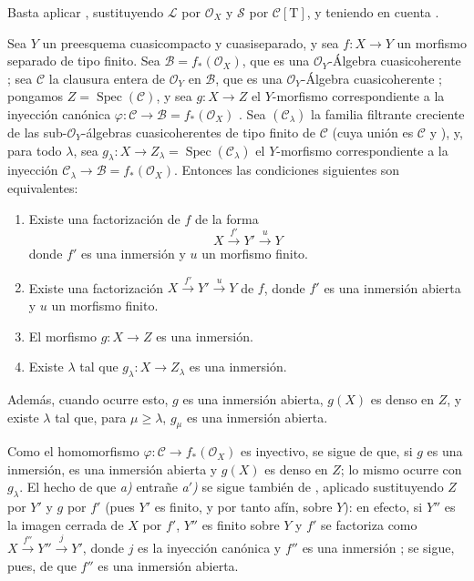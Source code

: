 Basta aplicar , sustituyendo $\mathcal L$ por $\mathcal O_X$ y $\mathcal S$ por $\mathcal C[\mathrm T]$, y teniendo en cuenta .


\begin{proposition}[8.12.3]
Sea $Y$ un preesquema cuasicompacto y cuasiseparado, y sea $f:X\to Y$ un morfismo separado de tipo finito.
Sea $\mathcal B=f_*(\mathcal O_X)$, que es una $\mathcal O_Y$-Álgebra cuasicoherente ; sea $\mathcal C$ la clausura entera de $\mathcal O_Y$ en $\mathcal B$, que es una $\mathcal O_Y$-Álgebra cuasicoherente ; pongamos $Z=\operatorname{Spec}(\mathcal C)$, y sea $g:X\to Z$ el $Y$-morfismo correspondiente a la inyección canónica $\varphi:\mathcal C\to\mathcal B=f_*(\mathcal O_X)$ . Sea $(\mathcal C_\lambda)$ la familia filtrante creciente de las sub-$\mathcal O_Y$-álgebras cuasicoherentes de tipo finito de $\mathcal C$ (cuya unión es $\mathcal C$  y ), y, para todo $\lambda$, sea $g_\lambda:X\to Z_\lambda=\operatorname{Spec}(\mathcal C_\lambda)$ el $Y$-morfismo correspondiente a la inyección $\mathcal C_\lambda\to\mathcal B=f_*(\mathcal O_X)$.
Entonces las condiciones siguientes son equivalentes:
\begin{enumerate}[label=\emph{\alph*)}]
  \item[\emph{a)}] Existe una factorización de $f$ de la forma
\[
X\xrightarrow{f'}Y'\xrightarrow{u}Y
\]
donde $f'$ es una inmersión y $u$ un morfismo finito.
  \item[\emph{a$'$)}] Existe una factorización $X\xrightarrow{f'}Y'\xrightarrow{u}Y$ de $f$, donde $f'$ es una inmersión abierta y $u$ un morfismo finito.
  \item[\emph{b)}] El morfismo $g:X\to Z$ es una inmersión.
  \item[\emph{c)}] Existe $\lambda$ tal que $g_\lambda:X\to Z_\lambda$ es una inmersión.
\end{enumerate}
Además, cuando ocurre esto, $g$ es una inmersión abierta, $g(X)$ es denso en $Z$, y existe $\lambda$ tal que, para $\mu\geq\lambda$, $g_\mu$ es una inmersión abierta.
\end{proposition}

Como el homomorfismo $\varphi:\mathcal C\to f_*(\mathcal O_X)$ es inyectivo, se sigue de  que, si $g$ es una inmersión, es una inmersión abierta y $g(X)$ es denso en $Z$; lo mismo ocurre con $g_\lambda$.
El hecho de que \emph{a)} entrañe \emph{a$'$)} se sigue también de , aplicado sustituyendo $Z$ por $Y'$ y $g$ por $f'$ (pues $Y'$ es finito, y por tanto afín, sobre $Y$): en efecto, si $Y''$ es la imagen cerrada de $X$ por $f'$, $Y''$ es finito sobre $Y$ y $f'$ se factoriza como $X\xrightarrow{f''}Y''\xrightarrow{j}Y'$, donde $j$ es la inyección canónica y $f''$ es una inmersión ; se sigue, pues, de  que $f''$ es una inmersión abierta.

